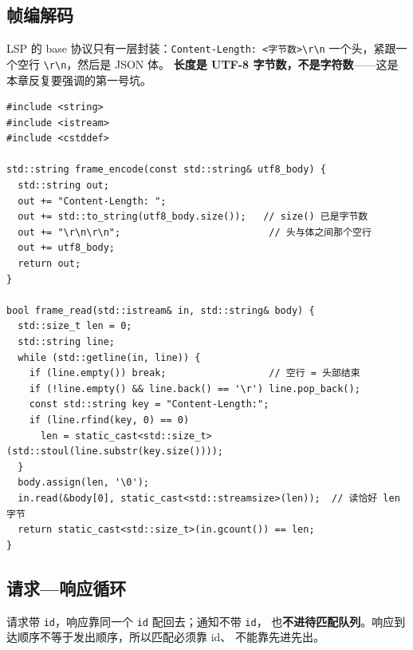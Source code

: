 \documentclass[12pt,a4paper,fontset=fandol]{ctexbook}
\begin{document}
\subsection{帧编解码}\label{sec:ch08-s1b}

LSP 的 base 协议只有一层封装：\texttt{Content-Length: <字节数>}\texttt{\textbackslash r\textbackslash n}
一个头，紧跟一个空行 \texttt{\textbackslash r\textbackslash n}，然后是 JSON 体。
\textbf{长度是 UTF-8 字节数，不是字符数}——这是本章反复要强调的第一号坑。

\begin{lstlisting}[style=cppstyle,caption={帧编解码核心：读满 Content-Length 个字节，按字节而非字符},label={lst:ch08-frame}]
#include <string>
#include <istream>
#include <cstddef>

std::string frame_encode(const std::string& utf8_body) {
  std::string out;
  out += "Content-Length: ";
  out += std::to_string(utf8_body.size());   // size() 已是字节数
  out += "\r\n\r\n";                          // 头与体之间那个空行
  out += utf8_body;
  return out;
}

bool frame_read(std::istream& in, std::string& body) {
  std::size_t len = 0;
  std::string line;
  while (std::getline(in, line)) {
    if (line.empty()) break;                  // 空行 = 头部结束
    if (!line.empty() && line.back() == '\r') line.pop_back();
    const std::string key = "Content-Length:";
    if (line.rfind(key, 0) == 0)
      len = static_cast<std::size_t>(std::stoul(line.substr(key.size())));
  }
  body.assign(len, '\0');
  in.read(&body[0], static_cast<std::streamsize>(len));  // 读恰好 len 字节
  return static_cast<std::size_t>(in.gcount()) == len;
}
\end{lstlisting}

\subsection{请求—响应循环}\label{sec:ch08-s1c}

请求带 \texttt{id}，响应靠同一个 \texttt{id} 配回去；通知不带 \texttt{id}，
也\textbf{不进待匹配队列}。响应到达顺序不等于发出顺序，所以匹配必须靠 id、
不能靠先进先出。
\end{document}
